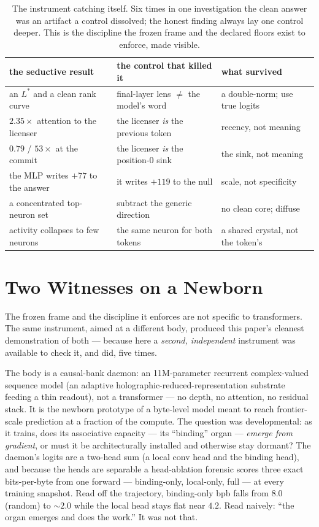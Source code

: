 \documentclass[11pt,a4paper]{article}
\begin{document}
\begin{table}[H]
\centering \small
\begin{tabular}{lll}
\toprule
the seductive result & the control that killed it & what survived \\
\midrule
an $L^*$ and a clean rank curve & final-layer lens $\neq$ the model's word & a double-norm; use true logits \\
$2.35\times$ attention to the licenser & the licenser \emph{is} the previous token & recency, not meaning \\
$0.79$ / $53\times$ at the commit & the licenser \emph{is} the position-0 sink & the sink, not meaning \\
the MLP writes $+77$ to the answer & it writes $+119$ to the null & scale, not specificity \\
a concentrated top-neuron set & subtract the generic direction & no clean core; diffuse \\
activity collapses to few neurons & the same neuron for both tokens & a shared crystal, not the token's \\
\bottomrule
\end{tabular}
\caption{The instrument catching itself. Six times in one investigation the clean answer
was an artifact a control dissolved; the honest finding always lay one control deeper.
This is the discipline the frozen frame and the declared floors exist to enforce, made
visible.}
\label{tab:discipline}
\end{table}

\section{Two Witnesses on a Newborn}

The frozen frame and the discipline it enforces are not specific to transformers. The
same instrument, aimed at a different body, produced this paper's cleanest demonstration
of both --- because here a \emph{second, independent} instrument was available to check it,
and did, five times.

The body is a causal-bank daemon: an 11M-parameter recurrent complex-valued sequence model
(an adaptive holographic-reduced-representation substrate feeding a thin readout), not a
transformer --- no depth, no attention, no residual stack. It is the newborn prototype of a
byte-level model meant to reach frontier-scale prediction at a fraction of the compute. The
question was developmental: as it trains, does its associative capacity --- its ``binding''
organ --- \emph{emerge from gradient}, or must it be architecturally installed and otherwise
stay dormant? The daemon's logits are a two-head sum (a local conv head and the binding
head), and because the heads are separable a head-ablation forensic scores three exact
bits-per-byte from one forward --- binding-only, local-only, full --- at every training
snapshot. Read off the trajectory, binding-only bpb falls from $8.0$ (random) to
$\sim\!2.0$ while the local head stays flat near $4.2$. Read naively: ``the organ emerges
and does the work.'' It was not that.
\end{document}
